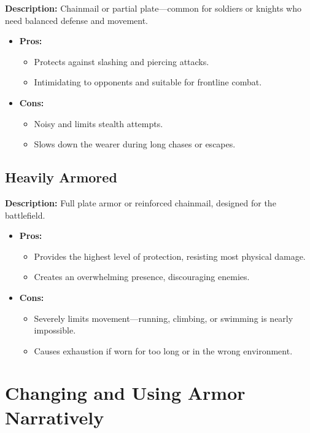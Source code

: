 \textbf{Description:} Chainmail or partial plate—common for soldiers or knights who need balanced defense and movement.

\begin{itemize}
    \item \textbf{Pros:}
    \begin{itemize}
        \item Protects against slashing and piercing attacks.
        \item Intimidating to opponents and suitable for frontline combat.
    \end{itemize}
    \item \textbf{Cons:}
    \begin{itemize}
        \item Noisy and limits stealth attempts.
        \item Slows down the wearer during long chases or escapes.
    \end{itemize}
\end{itemize}

\subsection*{Heavily Armored}

\textbf{Description:} Full plate armor or reinforced chainmail, designed for the battlefield.

\begin{itemize}
    \item \textbf{Pros:}
    \begin{itemize}
        \item Provides the highest level of protection, resisting most physical damage.
        \item Creates an overwhelming presence, discouraging enemies.
    \end{itemize}
    \item \textbf{Cons:}
    \begin{itemize}
        \item Severely limits movement—running, climbing, or swimming is nearly impossible.
        \item Causes exhaustion if worn for too long or in the wrong environment.
    \end{itemize}
\end{itemize}

\section{Changing and Using Armor Narratively}

